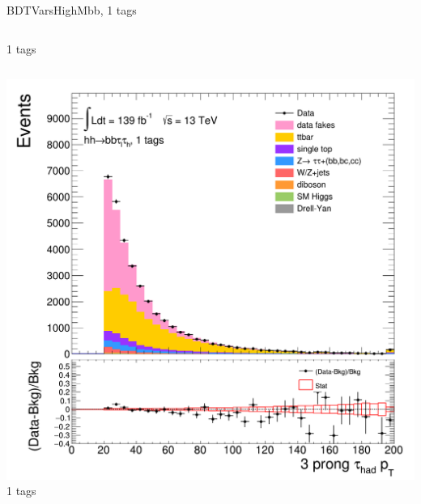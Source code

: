 \begin{frame}{BDTVarsHighMbb, 1 tags}
\begin{columns}[c]
    1 tags
  \end{columns}
  \begin{columns}[c]
    \centering\includegraphics[width=\textwidth]{C_1tag2pjet_0ptv_TauPt3P}\\
    1 tags
  \end{columns}
\end{frame}

